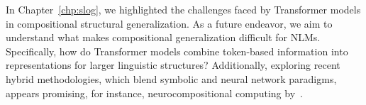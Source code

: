 In Chapter~\ref{chp:slog}, we highlighted the challenges faced by Transformer models in compositional structural generalization. As a future endeavor, we aim to understand what makes compositional generalization difficult for NLMs. Specifically, how do Transformer models combine token-based information into representations for larger linguistic structures? Additionally, exploring recent hybrid methodologies, which blend symbolic and neural network paradigms, appears promising, for instance, neurocompositional computing by~\cite{smolensky2022neurocompositional}.